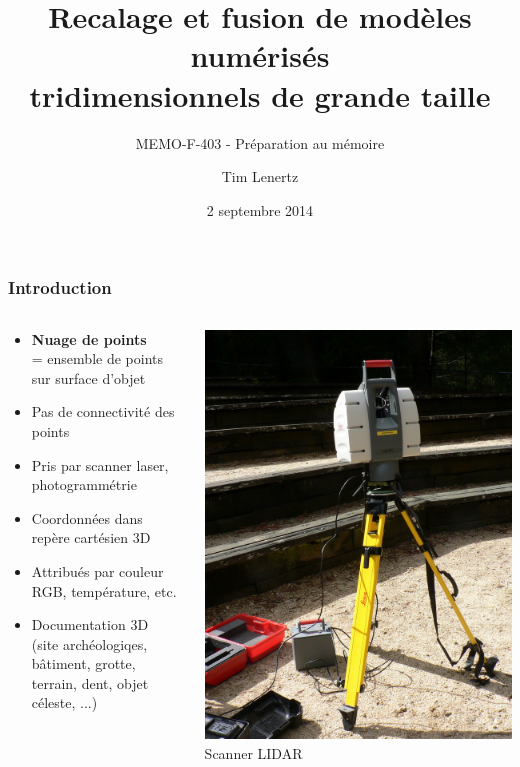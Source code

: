 \documentclass{beamer}
\title{\textbf{Recalage et fusion de modèles numérisés\\tridimensionnels de grande taille}}
\subtitle{MEMO-F-403 - Préparation au mémoire}
\author{Tim Lenertz}
\date{2 septembre 2014}
\institute{ULB}
\begin{document}
\begin{frame}
\frametitle{Introduction}
	\begin{columns}
	\begin{column}[T]{.7\textwidth}
		\begin{itemize}
		\item \textbf{Nuage de points}\\
			= ensemble de points sur surface d'objet
		\item Pas de connectivité des points
		\item Pris par scanner laser, photogrammétrie
		\item Coordonnées dans repère cartésien 3D 
		\item Attribués par couleur RGB, température, etc.
		\item Documentation 3D \\
			(site archéologiqes, bâtiment, grotte, terrain, dent, objet céleste, ...)
		\end{itemize}
	\end{column}
	\begin{column}[T]{.3\textwidth}
		\includegraphics[width=\textwidth]{lidar.jpg}
		\\ \footnotesize Scanner LIDAR
	\end{column}
	\end{columns}
\end{frame}
\end{document}
